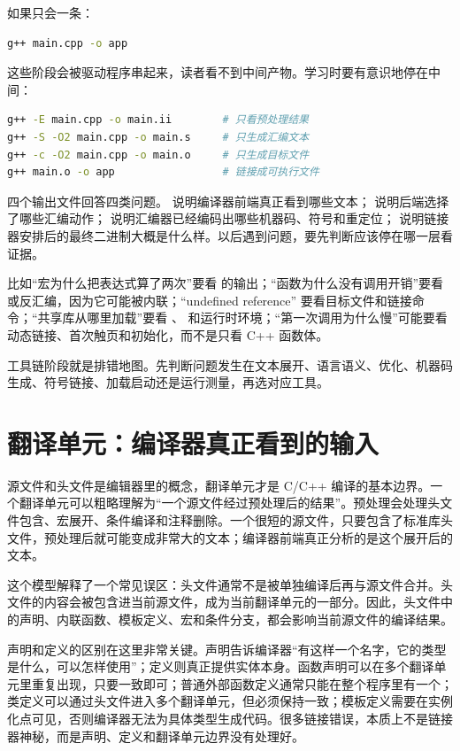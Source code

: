 如果只会一条：

\begin{lstlisting}[language=bash]
g++ main.cpp -o app
\end{lstlisting}

这些阶段会被驱动程序串起来，读者看不到中间产物。学习时要有意识地停在中间：

\begin{lstlisting}[language=bash,caption={把一条构建链拆开观察}]
g++ -E main.cpp -o main.ii        # 只看预处理结果
g++ -S -O2 main.cpp -o main.s     # 只生成汇编文本
g++ -c -O2 main.cpp -o main.o     # 只生成目标文件
g++ main.o -o app                 # 链接成可执行文件
\end{lstlisting}

四个输出文件回答四类问题。 说明编译器前端真正看到哪些文本； 说明后端选择了哪些汇编动作； 说明汇编器已经编码出哪些机器码、符号和重定位； 说明链接器安排后的最终二进制大概是什么样。以后遇到问题，要先判断应该停在哪一层看证据。

比如“宏为什么把表达式算了两次”要看  的输出；“函数为什么没有调用开销”要看  或反汇编，因为它可能被内联；“undefined reference” 要看目标文件和链接命令；“共享库从哪里加载”要看 、 和运行时环境；“第一次调用为什么慢”可能要看动态链接、首次触页和初始化，而不是只看 C++ 函数体。

\begin{keyidea}
工具链阶段就是排错地图。先判断问题发生在文本展开、语言语义、优化、机器码生成、符号链接、加载启动还是运行测量，再选对应工具。
\end{keyidea}

\section{翻译单元：编译器真正看到的输入}

源文件和头文件是编辑器里的概念，翻译单元才是 C/C++ 编译的基本边界。一个翻译单元可以粗略理解为“一个源文件经过预处理后的结果”。预处理会处理头文件包含、宏展开、条件编译和注释删除。一个很短的源文件，只要包含了标准库头文件，预处理后就可能变成非常大的文本；编译器前端真正分析的是这个展开后的文本。

这个模型解释了一个常见误区：头文件通常不是被单独编译后再与源文件合并。头文件的内容会被包含进当前源文件，成为当前翻译单元的一部分。因此，头文件中的声明、内联函数、模板定义、宏和条件分支，都会影响当前源文件的编译结果。

声明和定义的区别在这里非常关键。声明告诉编译器“有这样一个名字，它的类型是什么，可以怎样使用”；定义则真正提供实体本身。函数声明可以在多个翻译单元里重复出现，只要一致即可；普通外部函数定义通常只能在整个程序里有一个；类定义可以通过头文件进入多个翻译单元，但必须保持一致；模板定义需要在实例化点可见，否则编译器无法为具体类型生成代码。很多链接错误，本质上不是链接器神秘，而是声明、定义和翻译单元边界没有处理好。

